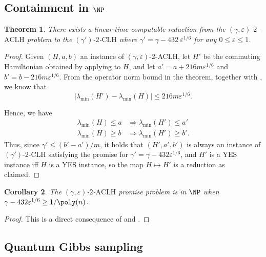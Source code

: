 \documentclass[11pt]{article}
\theoremstyle{plain}
\newtheorem{theorem}{Theorem}[section]
\newtheorem{corollary}[theorem]{Corollary}
\newcommand{\eps}{\varepsilon}
\begin{document}
\subsection{Containment in $\NP$}
\begin{theorem}\label{thm:aclh-to-clh-reduction}
There exists a linear-time computable reduction from the $(\gamma, \eps)$-$2$-$\mathrm{ACLH}$ problem to the $(\gamma')$-$2$-$\mathrm{CLH}$ where $\gamma' = \gamma - 432\ \eps^{1/6}$ for any $0 \leq \eps \leq 1$.
\end{theorem}
\begin{proof}
Given $(H,a,b)$ an instance of $(\gamma,\eps)$-2-ACLH, let $H'$ be the commuting Hamiltonian obtained by applying  to $H$, and let $a' = a + 216m\eps^{1/6}$ and $b' = b - 216m\eps^{1/6}$. From the operator norm bound in the theorem, together with , we know that \[|\lambda_{\min}(H') - \lambda_{\min}(H)| \leq 216 m \eps^{1/6}. \] 

Hence, we have
\begin{align}
    \lambda_{\min}(H) \leq a &\Longrightarrow \lambda_{\min}(H') \leq a' \\
    \lambda_{\min}(H) \geq b &\Longrightarrow \lambda_{\min}(H') \geq b'.
\end{align}
Thus, since $\gamma' \leq (b'-a')/m$, it holds that $(H',a',b')$ is always an instance of $(\gamma')$-2-CLH satisfying the promise for $\gamma' = \gamma - 432\eps^{1/6}$, and $H'$ is a YES instance iff $H$ is a YES instance, so the map $H \mapsto H'$ is a reduction as claimed.
\end{proof}


\begin{corollary}
\label{corollary:NP-Containment}
    The $(\gamma, \eps)$-$2$-$\mathrm{ACLH}$ promise problem is in $\NP$ when $\gamma - 432\eps^{1/6} \geq 1/\poly(n)$.
\end{corollary}
\begin{proof}
This is a direct consequence of  and .
\end{proof}


\subsection{Quantum Gibbs sampling}\label{sec:Gibbs}
\end{document}
